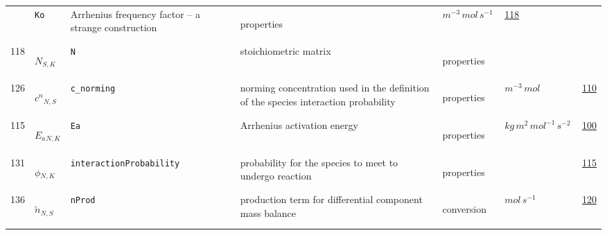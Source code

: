 \begin{longtable}{|p{1cm}|p{2.5cm}|p{4.5cm}|p{8cm}|p{3.0cm}|p{3cm}|p{1cm}|}
             & \verb|Ko|
             & Arrhenius frequency factor -- a strange construction
             & \begin{lay}properties \end{lay}
             & $ m^{-3} \,mol \,s^{-1} \, $
             &                 \hyperlink{"e:118"}{ 118 }
                 \\
            118
             & \hypertarget{"v:118"}{ $ {N}{_{S, K}} $}
             & \verb|N|
             & stoichiometric matrix
             & \begin{lay}properties \end{lay}
             & $  $
             & \\
            126
             & \hypertarget{"v:126"}{ $ {c^n}{_{N, S}} $}
             & \verb|c_norming|
             & norming concentration used in the definition of the species interaction probability
             & \begin{lay}properties \end{lay}
             & $ m^{-3} \,mol \, $
             &                 \hyperlink{"e:110"}{ 110 }
                 \\
            115
             & \hypertarget{"v:115"}{ $ {E_a}{_{N, K}} $}
             & \verb|Ea|
             & Arrhenius activation energy
             & \begin{lay}properties \end{lay}
             & $ kg \,m^{2} \,mol^{-1} \,s^{-2} \, $
             &                 \hyperlink{"e:100"}{ 100 }
                 \\
            131
             & \hypertarget{"v:131"}{ $ {\phi}{_{N, K}} $}
             & \verb|interactionProbability|
             & probability for the species to meet to undergo reaction
             & \begin{lay}properties \end{lay}
             & $  $
             &                 \hyperlink{"e:115"}{ 115 }
                 \\
            136
             & \hypertarget{"v:136"}{ $ {{\tilde{n}}}{_{N, S}} $}
             & \verb|nProd|
             & production term for differential component mass balance
             & \begin{lay}conversion \end{lay}
             & $ mol \,s^{-1} \, $
             &                 \hyperlink{"e:120"}{ 120 }
                 \\
    \end{longtable}